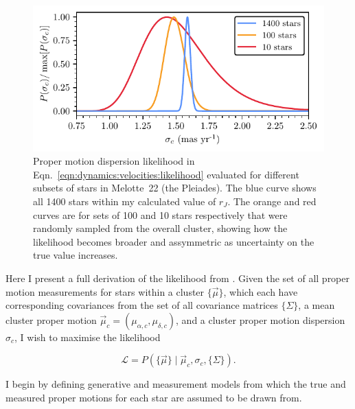\begin{figure}[t]
    \centering
    \includegraphics[width=\textwidth]{fig/c4/dispersion_pdf.pdf}
    \caption[Proper motion dispersion likelihood in Eqn.~\ref{eqn:dynamics:velocities:likelihood} evaluated for different subsets of stars in Melotte~22]{Proper motion dispersion likelihood in Eqn.~\ref{eqn:dynamics:velocities:likelihood} evaluated for different subsets of stars in Melotte~22 (the Pleiades). The blue curve shows all 1400 stars within my calculated value of $r_J$. The orange and red curves are for sets of 100 and 10 stars respectively that were randomly sampled from the overall cluster, showing how the likelihood becomes broader and assymmetric as uncertainty on the true value increases.}
    \label{fig:dynamics:velocities:pdfs}
\end{figure}

Here I present a full derivation of the likelihood from . Given the set of all proper motion measurements for stars within a cluster $\{\vec{\mu}\}$, which each have corresponding covariances from the set of all covariance matrices  $\{\Sigma\}$, a mean cluster proper motion $\vec{\mu}_c = (\mu_{\alpha, c}, \mu_{\delta, c})$, and a cluster proper motion dispersion $\sigma_c$, I wish to maximise the likelihood

\begin{equation}\label{eqn:dynamics:velocities:likelihood}
    \mathcal{L} 
    = P(\{\vec{\mu}\}\mid\vec{\mu}_c,\sigma_c,\{\Sigma\}).
\end{equation}

I begin by defining generative and measurement models from which the true and measured proper motions for each star are assumed to be drawn from. 


